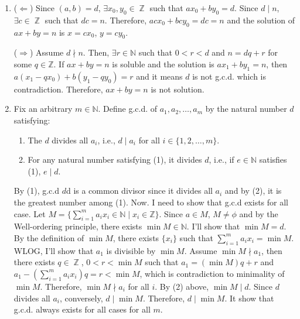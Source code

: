 \documentclass[12pt]{article}
\newenvironment{problem}[2][Problem]{\begin{trivlist}
\item[\hskip \labelsep {\bfseries #1}\hskip \labelsep {\bfseries #2.}]}{\end{trivlist}}
\DeclareMathOperator{\zz}{\mathbb{Z}}
\begin{document}




\begin{problem}{1}
\end{problem}
\begin{enumerate}

    \item[(a)] ($\Leftarrow$) Since $(a,b)=d$, $\exists x_0, y_0\in \zz$ such that $ax_0+by_0=d$. Since $d\mid n$, $\exists c\in \zz$ such that $dc=n$. Therefore, $acx_0+bcy_0=dc=n$ and the solution of $ax+by=n$ is $x=cx_0$, $y=cy_0$.
    
    ($\Rightarrow$) Assume $d\nmid n$. Then, $\exists r\in \mathbb{N}$ such that $0<r<d$ and $n=dq+r$ for some $q\in \mathbb{Z}$. If $ax+by=n$ is soluble and the solution is $ax_1+by_1=n$, then $a(x_1-qx_0)+b(y_1-qy_0)=r$ and it means $d$ is not g.c.d. which is contradiction. Therefore, $ax+by=n$ is not solution.

    \item[(b)] Fix an arbitrary $m\in \mathbb{N}$. Define g.c.d. of $a_1, a_2, \ldots, a_m$ by the natural number $d$ satisfying:
    
    \begin{enumerate}
    	\item[(1)] The $d$ divides all $a_i$, i.e., $d \mid a_i$ for all $i\in \{1, 2, \ldots, m\}$.
    	\item[(2)] For any natural number satisfying (1), it divides $d$, i.e., if $e\in \mathbb{N}$ satisfies (1), $e\mid d$.
    \end{enumerate}
    
    By (1), g.c.d $d$d is a common divisor since it divides all $a_i$ and by (2), it is the greatest number among (1). Now. I need to show that g.c.d exists for all case.    
    Let $M=\{\sum\limits_{i=1}^m a_i x_i\in \mathbb{N} \mid x_i\in \mathbb{Z}\}$. Since $a\in M$, $M\neq \phi$ and by the Well-ordering principle, there exists $\min M\in \mathbb{N}$. I'll show that $\min M=d$.
    By the definition of $\min M$, there exists $\{x_i\}$ such that $\sum\limits_{i=1}^m a_i x_i=\min M$. WLOG, I'll show that $a_1$ is divisible by $\min M$. Assume $\min M \nmid a_1$, then there exists $q\in \zz$, $0<r<\min M$ such that $a_1=(\min M)q+r$ and $a_1-(\sum\limits_{i=1}^m a_i x_i)q=r<\min M$, which is contradiction to minimality of $\min M$. Therefore, $\min M \nmid a_i$ for all $i$. By (2) above, $\min M \mid d$.
    Since $d$ divides all $a_i$, conversely, $d\mid \min M$. Therefore, $d\mid \min M$. It show that g.c.d. always exists for all cases for all $m$.
    

\end{enumerate}
\end{document}
